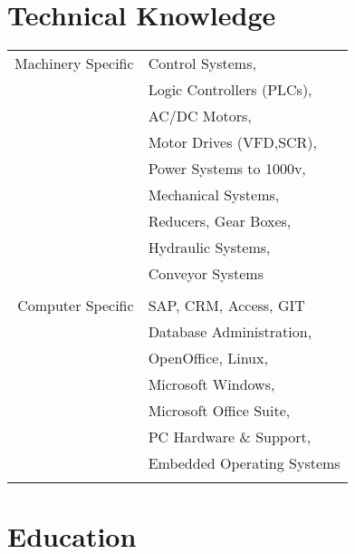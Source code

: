 \documentclass[10pt]{article} %
\begin{document}
\begin{minipage}[t]{0.44\textwidth}
\begin{tabular}{rl}
\end{tabular}\\[10pt]


\section{Technical Knowledge} 

\begin{tabular}{rl}
Machinery Specific
& Control Systems, \\ 
& Logic Controllers (PLCs), \\
& AC/DC Motors, \\
& Motor Drives (VFD,SCR), \\
& Power Systems to 1000v, \\
& Mechanical Systems, \\
& Reducers, Gear Boxes, \\
& Hydraulic Systems, \\
& Conveyor Systems \\ \\
Computer Specific
& SAP, CRM, Access, GIT \\
& Database Administration, \\
& OpenOffice, Linux,\\
& Microsoft Windows, \\
& Microsoft Office Suite, \\
& PC Hardware \& Support,\\
& Embedded Operating Systems \\ 
\\
\end{tabular}


\section{Education} 

\begin{tabular}{rl} %



\end{tabular}
\end{minipage}
\end{document}
